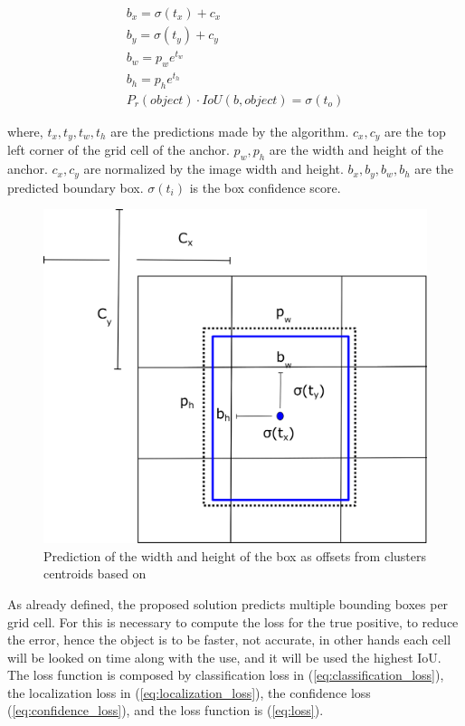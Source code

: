     
    \begin{equation}
    \label{eq:bound}
    \begin{aligned}
        b_x = \sigma(t_x) + c_x \\
        b_y = \sigma(t_y) + c_y \\
        b_w = p_we^{t_w} \\
        b_h = p_he^{t_h} \\
        P_r(object)\cdot IoU(b,object) = \sigma(t_o)
    \end{aligned}
    \end{equation}

where, $t_x, t_y, t_w, t_h$ are the predictions made by the algorithm. 
$c_x, c_y$ are the top left corner of the grid cell of the anchor.
$p_w, p_h$ are the width and height of the anchor. 
$c_x, c_y$ are normalized by the image width and height. 
$b_x, b_y, b_w, b_h$ are the predicted boundary box. 
$\sigma(t_i)$ is the box confidence score.

\begin{figure}[H]
\centering
\includegraphics[scale=0.5]{imagens/anchor.png}
\caption{Prediction of the width and height of the box as offsets from clusters centroids based on \cite{redmon2017yolo9000}}
\label{fig:anchor}
\end{figure}

As already defined, the proposed solution predicts multiple bounding boxes per grid cell. For this is necessary to compute the loss for the true positive, to reduce the error, hence the object is to be faster, not accurate, in other hands each cell will be looked on time along with the use, and it will be used the highest IoU. The loss function is composed by classification loss in (\ref{eq:classification_loss}), the localization loss in (\ref{eq:localization_loss}), the confidence loss (\ref{eq:confidence_loss}), and the loss function is (\ref{eq:loss}). 


